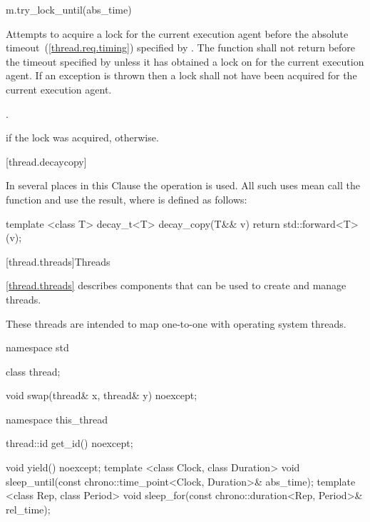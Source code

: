 \begin{itemdecl}
m.try_lock_until(abs_time)
\end{itemdecl}

\begin{itemdescr}
\pnum
\effects Attempts to acquire a lock for the current execution agent before the absolute
timeout~(\ref{thread.req.timing}) specified by . The function shall not return
before the timeout specified by  unless it has obtained a lock on  for
the current execution agent. If an exception is thrown then a lock shall not have been acquired
for the current execution agent.

\pnum
\returntype {}.

\pnum
\returns {} if the lock was acquired,  otherwise.
\end{itemdescr}

[thread.decaycopy]{}

\pnum
In several places in this Clause the operation
 is used. All
such uses mean call the function  and use the
result, where  is defined as follows:

\begin{codeblock}
template <class T> decay_t<T> decay_copy(T&& v)
  { return std::forward<T>(v); }
\end{codeblock}

[thread.threads]{Threads}

\pnum
\ref{thread.threads} describes components that can be used to create and manage threads.
\begin{note} These threads are intended to map one-to-one with operating system threads.
\end{note}

%

\begin{codeblock}
namespace std {
  class thread;

  void swap(thread& x, thread& y) noexcept;

  namespace this_thread {
    thread::id get_id() noexcept;

    void yield() noexcept;
    template <class Clock, class Duration>
      void sleep_until(const chrono::time_point<Clock, Duration>& abs_time);
    template <class Rep, class Period>
      void sleep_for(const chrono::duration<Rep, Period>& rel_time);
  }
}
\end{codeblock}

